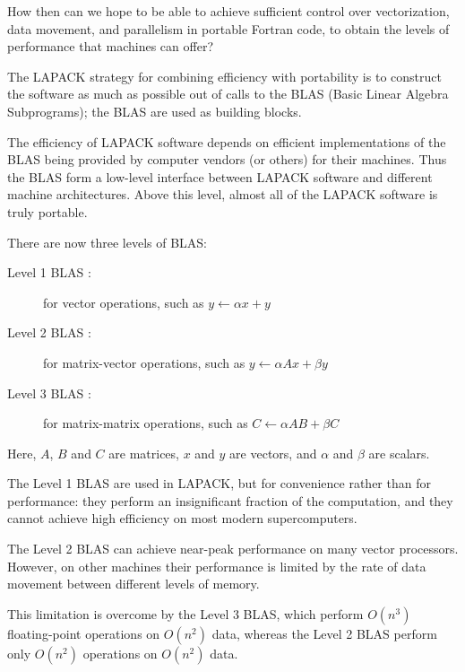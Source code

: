 How then can we hope to be able to achieve sufficient control over
vectorization, data movement, and parallelism in portable Fortran code,
to obtain the levels of performance that machines can offer?

The LAPACK strategy for combining
efficiency with portability is to construct the software
as much as possible
out of calls to the BLAS (Basic Linear Algebra Subprograms); the BLAS are
used
as building blocks.

The efficiency of LAPACK software depends on efficient
implementations
of the BLAS being provided by computer vendors (or others) for their
machines.
Thus the BLAS form a low-level interface between LAPACK software and
different machine architectures.
Above this level, almost all of the LAPACK software is truly portable.

There are now three levels of BLAS:

\begin{description}

\item[Level 1 BLAS \cite{blas1}:] for vector operations, such as
$y \leftarrow \alpha x + y$

\item[Level 2 BLAS \cite{blas2}:] for matrix-vector operations, such as
$y \leftarrow \alpha A x + \beta y$

\item[Level 3 BLAS \cite{blas3}:] for matrix-matrix operations, such as
$C \leftarrow \alpha A B + \beta C$

\end{description}

Here, $A$, $B$ and $C$ are matrices, $x$ and $y$ are vectors, and $\alpha$
and
$\beta$ are scalars.

The Level 1 BLAS are used in LAPACK,
but for convenience rather than
for performance: they perform an insignificant fraction of the computation,
and they cannot achieve high efficiency on most modern supercomputers.

The Level 2 BLAS can achieve near-peak performance
on many vector processors.
However, on other machines
their performance is limited by the rate of data movement between different
levels of memory.

This limitation is overcome by the Level 3 BLAS,
which perform $O(n^3)$
floating-point operations on $O(n^2)$ data, whereas the Level 2 BLAS
perform only $O(n^2)$ operations on $O(n^2)$ data.

